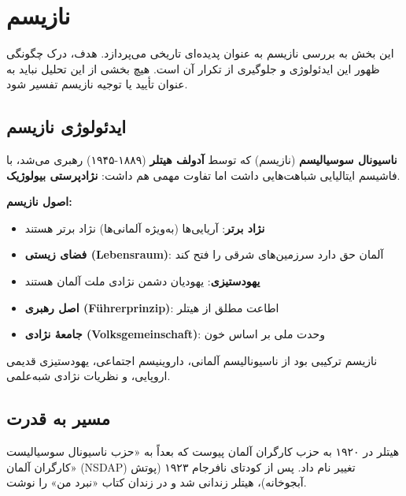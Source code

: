 \section{نازیسم}

\begin{tcolorbox}[
    enhanced,
    colback=leftred!10,
    colframe=leftred!80!black,
    boxrule=2pt,
    arc=5pt,
    fonttitle=\bfseries,
    title={\rl{⚠️ هشدار تاریخی}}
]
این بخش به بررسی نازیسم به عنوان پدیده‌ای تاریخی می‌پردازد. هدف، درک چگونگی ظهور این ایدئولوژی و جلوگیری از تکرار آن است. هیچ بخشی از این تحلیل نباید به عنوان تأیید یا توجیه نازیسم تفسیر شود.
\end{tcolorbox}

\subsection{ایدئولوژی نازیسم}


\textbf{ناسیونال سوسیالیسم} (نازیسم) که توسط \textbf{آدولف هیتلر} (۱۸۸۹-۱۹۴۵) رهبری می‌شد، با فاشیسم ایتالیایی شباهت‌هایی داشت اما تفاوت مهمی هم داشت: \textbf{نژادپرستی بیولوژیک}.

\textbf{اصول نازیسم:}
\begin{itemize}
    \item \textbf{نژاد برتر}: آریایی‌ها (به‌ویژه آلمانی‌ها) نژاد برتر هستند
    \item \textbf{فضای زیستی (Lebensraum)}: آلمان حق دارد سرزمین‌های شرقی را فتح کند
    \item \textbf{یهودستیزی}: یهودیان دشمن نژادی ملت آلمان هستند
    \item \textbf{اصل رهبری (Führerprinzip)}: اطاعت مطلق از هیتلر
    \item \textbf{جامعهٔ نژادی (Volksgemeinschaft)}: وحدت ملی بر اساس خون
\end{itemize}

نازیسم ترکیبی بود از ناسیونالیسم آلمانی، داروینیسم اجتماعی، یهودستیزی قدیمی اروپایی، و نظریات نژادی شبه‌علمی.


\subsection{مسیر به قدرت}


هیتلر در ۱۹۲۰ به حزب کارگران آلمان پیوست که بعداً به «حزب ناسیونال سوسیالیست کارگران آلمان» (NSDAP) تغییر نام داد. پس از کودتای نافرجام ۱۹۲۳ (پوتش آبجوخانه)، هیتلر زندانی شد و در زندان کتاب «نبرد من» را نوشت.

